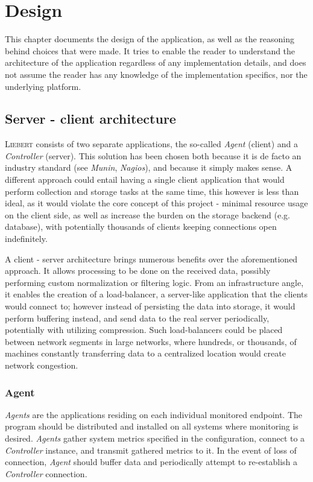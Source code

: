 \section{Design}
    This chapter documents the design of the application, as well as the reasoning behind choices that were made. It tries to enable the reader to understand the architecture of the application regardless of any implementation details, and does not assume the reader has any knowledge of the implementation specifics, nor the underlying platform.
    
    \subsection{Server - client architecture}\label{sec:architecture}
        \textsc{Liebert} consists of two separate applications, the so-called \textit{Agent} (client) and a \textit{Controller} (server). This solution has been chosen both because it is de facto an industry standard (see \textit{Munin}, \textit{Nagios}), and because it simply makes sense. A different approach could entail having a single client application that would perform collection and storage tasks at the same time, this however is less than ideal, as it would violate the core concept of this project - minimal resource usage on the client side, as well as increase the burden on the storage backend (e.g. database), with potentially thousands of clients keeping connections open indefinitely.
        
        A client - server architecture brings numerous benefits over the aforementioned approach. It allows processing  to be done on the received data, possibly performing custom normalization or filtering logic. From an infrastructure angle, it enables the creation of a load-balancer, a server-like application that the clients would connect to; however instead of persisting the data into storage, it would perform buffering instead, and send data to the real server periodically, potentially with utilizing compression. Such load-balancers could be placed between network segments in large networks, where hundreds, or thousands, of machines constantly transferring data to a centralized location would create network congestion.
        
        \subsubsection{Agent}
            \textit{Agents} are the applications residing on each individual monitored endpoint. The program should be distributed and installed on all systems where monitoring is desired. \textit{Agents} gather system metrics specified in the configuration, connect to a \textit{Controller} instance, and transmit gathered metrics to it. In the event of loss of connection, \textit{Agent} should buffer data and periodically attempt to re-establish a \textit{Controller} connection.
            
